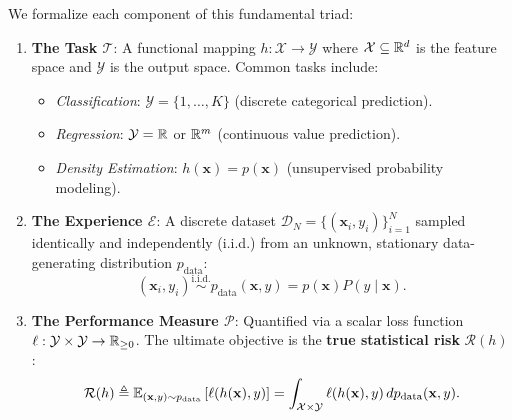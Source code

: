 We formalize each component of this fundamental triad:
\begin{enumerate}
  \item \textbf{The Task $\mathcal{T}$}: A functional mapping $h: \mathcal{X} \to \mathcal{Y}$ where $\mathcal{X} \subseteq \mathbb{R}^d$ is the feature space and $\mathcal{Y}$ is the output space. Common tasks include:
    \begin{itemize}[noitemsep]
      \item \textit{Classification}: $\mathcal{Y} = \{1, \dots, K\}$ (discrete categorical prediction).
      \item \textit{Regression}: $\mathcal{Y} = \mathbb{R}$ or $\mathbb{R}^m$ (continuous value prediction).
      \item \textit{Density Estimation}: $h(\mathbf{x}) = p(\mathbf{x})$ (unsupervised probability modeling).
    \end{itemize}
  \item \textbf{The Experience $\mathcal{E}$}: A discrete dataset $\mathcal{D}_N = \{(\mathbf{x}_i, y_i)\}_{i=1}^N$ sampled identically and independently (i.i.d.) from an unknown, stationary data-generating distribution $p_{\text{data}}$:
    \begin{equation}
    (\mathbf{x}_i, y_i) \overset{\text{i.i.d.}}{\sim} p_{\text{data}}(\mathbf{x}, y) = p(\mathbf{x}) P(y \mid \mathbf{x}).
    \label{eq:iid_sampling}
    \end{equation}
  \item \textbf{The Performance Measure $\mathcal{P}$}: Quantified via a scalar loss function $\ell: \mathcal{Y} \times \mathcal{Y} \to \mathbb{R}_{\ge 0}$. The ultimate objective is the \textbf{true statistical risk} $\mathcal{R}(h)$:
    \begin{equation}
    \mathcal{R}(h) \triangleq \mathbb{E}_{(\mathbf{x}, y) \sim p_{\text{data}}} \left[ \ell(h(\mathbf{x}), y) \right] = \int_{\mathcal{X} \times \mathcal{Y}} \ell(h(\mathbf{x}), y) \, dp_{\text{data}}(\mathbf{x}, y).
    \label{eq:true_risk_integral}
    \end{equation}
\end{enumerate}

